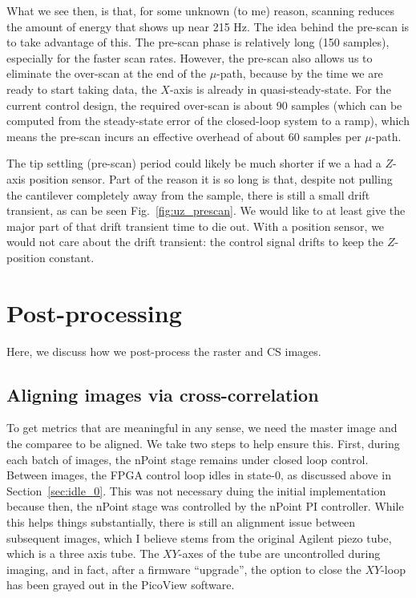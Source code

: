 \documentclass[twocolumn,twoside]{IEEEtran/IEEEtran}
\begin{document}
What we see then, is that, for some unknown (to me) reason, scanning reduces the
amount of energy that shows up near 215 Hz. The idea behind the pre-scan is to
take advantage of this. The pre-scan phase is relatively long (150 samples),
especially for the faster scan rates. However, the pre-scan also allows us to
eliminate the over-scan at the end of the $\mu$-path, because by the time we are
ready to start taking data, the $X$-axis is already in quasi-steady-state. For
the current control design, the required over-scan is about 90 samples (which
can be computed from the steady-state error of the closed-loop system to a
ramp), which means the pre-scan incurs an effective overhead of about 60 samples
per $\mu$-path.

The tip settling (pre-scan) period could likely be much shorter if we a had a
$Z$-axis position sensor. Part of the reason it is so long is that, despite not
pulling the cantilever completely away from the sample, there is still a small
drift transient, as can be seen Fig.~\ref{fig:uz_prescan}. We would like to at
least give the major part of that drift transient time to die out. With a
position sensor, we would not care about the drift transient: the control signal
drifts to keep the $Z$-position constant.

\section{Post-processing}\label{sec:post_process}
Here, we discuss how we post-process the raster and CS images.

\subsection{Aligning images via cross-correlation}\label{sec:align}
To get metrics that are meaningful in any sense, we need the master image and
the comparee to be aligned. We take two steps to help ensure this. First, during
each batch of images, the nPoint stage remains under closed loop control.
Between images, the FPGA control loop idles in state-0, as discussed above in
Section~\ref{sec:idle_0}. This was not necessary duing the initial
implementation because then, the nPoint stage was controlled by the nPoint PI
controller. While this helps things substantially, there is still an alignment
issue between subsequent images, which I believe stems from the original Agilent
piezo tube, which is a three axis tube. The $XY$-axes of the tube are
uncontrolled during imaging, and in fact, after a firmware ``upgrade'', the
option to close the $XY$-loop has been grayed out in the PicoView software.
\end{document}
